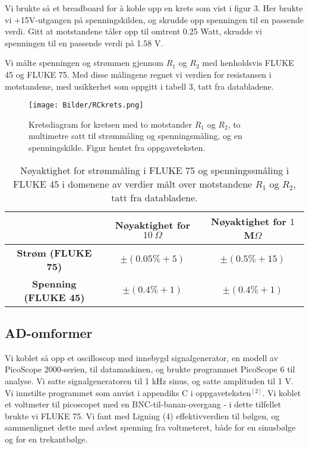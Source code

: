 \documentclass[norsk,a4paper,12pt]{article}
\begin{document}
Vi brukte så et breadboard for å koble opp en krets som vist i figur 3. Her brukte vi +15V-utgangen på spenningskilden, og skrudde opp spenningen til en passende verdi. Gitt at motstandene tåler opp til omtrent 0.25 Watt, skrudde vi spenningen til en passende verdi på 1.58 V.

Vi målte spenningen og strømmen gjennom $R_1$ og $R_2$ med henholdsvis FLUKE 45 og FLUKE 75. Med disse målingene regnet vi verdien for resistansen i motstandene, med usikkerhet som oppgitt i tabell 3, tatt fra databladene.


\begin{figure}
\begin{center}
\texttt{[image: Bilder/RCkrets.png]}\\
\caption{Kretsdiagram for kretsen med to motstander $R_1$ og $R_2$, to multimetre satt til strømmåling og spenningsmåling, og en spenningskilde. Figur hentet fra oppgaveteksten.}\label{fig:rckrets}
\end{center}
\end{figure}
\begin{table}
  \begin{center}
  \caption{Nøyaktighet for strømmåling i FLUKE 75 og spenningssmåling i FLUKE 45 i domenene av verdier målt over motstandene $R_1$ og $R_2$, tatt fra databladene.}
  \begin{tabular}{|c|c|c|} \hline
  \textbf{} & \textbf{Nøyaktighet for $10 \ \Omega$} & \textbf{Nøyaktighet for $1$ M$\Omega$} \\ \hline
  \textbf{Strøm (FLUKE 75)} & $\pm (0.05\% +5)$  & $\pm (0.5\% + 15)$ \\ \hline
  \textbf{Spenning (FLUKE 45)} & $\pm (0.4\% + 1)$ & $\pm (0.4\% + 1)$ \\ \hline
  \end{tabular}
  \end{center}
  \label{tab:nøyaktighetstrømogspenning}
\end{table}


\subsection{AD-omformer}

Vi koblet så opp et oscilloscop med innebygd signalgenerator, en modell av PicoScope 2000-serien, til datamaskinen, og brukte programmet PicoScope 6 til analyse. Vi satte signalgeneratoren til 1 kHz sinus, og satte amplituden til 1 V. 
Vi innstilte programmet som anvist i appendiks C i oppgaveteksten$^{[2]}$. Vi koblet et voltmeter til picoscopet med en BNC-til-banan-overgang - i dette tilfellet brukte vi FLUKE 75. Vi fant med Ligning (4) effektivverdien til bølgen, og sammenlignet dette med avlest spenning fra voltmeteret, både for en sinusbølge og for en trekantbølge. 
\end{document}
